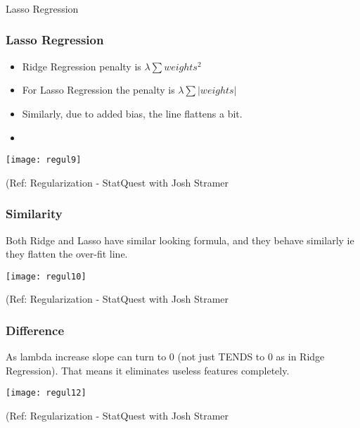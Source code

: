 \begin{frame}[fragile]\frametitle{}
\begin{center}
{\Large Lasso Regression}
\end{center}
\end{frame}

\begin{frame}[fragile]\frametitle{Lasso Regression}
\begin{itemize}
\item Ridge Regression penalty is $\lambda \sum{weights^2}$
\item For Lasso Regression the penalty is $\lambda \sum{|weights|}$
\item Similarly, due to added bias, the line flattens a bit.
\item 
\end{itemize}

\begin{center}
\texttt{[image: regul9]}
\end{center}

{\tiny (Ref: Regularization - StatQuest with Josh Stramer}
\end{frame}


\begin{frame}[fragile]\frametitle{Similarity}
Both Ridge and Lasso have similar looking formula, and they behave similarly ie they flatten the over-fit line. 


\begin{center}
\texttt{[image: regul10]}
\end{center}

{\tiny (Ref: Regularization - StatQuest with Josh Stramer}
\end{frame}

\begin{frame}[fragile]\frametitle{Difference}
As lambda increase slope can turn to 0 (not just TENDS to 0 as in Ridge Regression).
That means it eliminates useless features completely.

\begin{center}
\texttt{[image: regul12]}
\end{center}

{\tiny (Ref: Regularization - StatQuest with Josh Stramer}
\end{frame}



